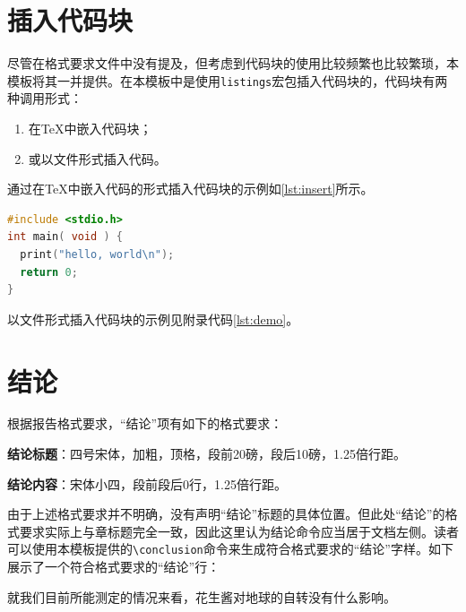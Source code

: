\section{插入代码块}

尽管在格式要求文件中没有提及，但考虑到代码块的使用比较频繁也比较繁琐，本模板将其一并提供。在本模板中是使用\texttt{listings}宏包插入代码块的，代码块有两种调用形式：

\begin{enumerate}
  \item 在\TeX 中嵌入代码块；
  \item 或以文件形式插入代码。
\end{enumerate}

通过在\TeX 中嵌入代码的形式插入代码块的示例如\ref{lst:insert}所示。

\begin{lstlisting}[language=C, caption={在\TeX 中嵌入代码的形式插入代码块\label{lst:insert}}]
#include <stdio.h>
int main( void ) {
  print("hello, world\n");
  return 0;
}
\end{lstlisting}

以文件形式插入代码块的示例见附录代码\ref{lst:demo}。
    
\section{结论}

根据报告格式要求，“结论”项有如下的格式要求：

\textbf{结论标题}：四号宋体，加粗，顶格，段前20磅，段后10磅，1.25倍行距。

\textbf{结论内容}：宋体小四，段前段后0行，1.25倍行距。

由于上述格式要求并不明确，没有声明“结论”标题的具体位置。但此处“结论”的格式要求实际上与章标题完全一致，因此这里认为结论命令应当居于文档左侧。读者可以使用本模板提供的\texttt{\textbackslash conclusion}命令来生成符合格式要求的“结论”字样。如下展示了一个符合格式要求的“结论”行：

\conclusion

就我们目前所能测定的情况来看，花生酱对地球的自转没有什么影响\cite{PeanutButter}。
